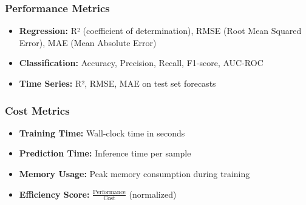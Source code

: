 \documentclass[11pt,a4paper]{article}
\begin{document}
\subsubsection{Performance Metrics}

\begin{itemize}
    \item \textbf{Regression:} R² (coefficient of determination), RMSE (Root Mean Squared Error), MAE (Mean Absolute Error)
    \item \textbf{Classification:} Accuracy, Precision, Recall, F1-score, AUC-ROC
    \item \textbf{Time Series:} R², RMSE, MAE on test set forecasts
\end{itemize}

\subsubsection{Cost Metrics}

\begin{itemize}
    \item \textbf{Training Time:} Wall-clock time in seconds
    \item \textbf{Prediction Time:} Inference time per sample
    \item \textbf{Memory Usage:} Peak memory consumption during training
    \item \textbf{Efficiency Score:} $\frac{\text{Performance}}{\text{Cost}}$ (normalized)
\end{itemize}




\end{document}
